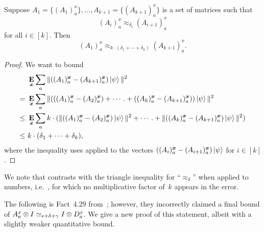 \begin{proposition}
\label{prop:triangle-inequality-for-approx_delta}
Suppose $A_1 = \{(A_1)^x_a\}, \ldots, A_{k+1} = \{(A_{k+1})^x_a\}$ is a set of matrices such that
\begin{equation*}
(A_i)^x_a \approx_{\delta_i} (A_{i+1})^x_a
\end{equation*}
for all $i \in [k]$. Then
\begin{equation*}
(A_1)^x_a \approx_{k \cdot (\delta_1 + \cdots + \delta_{k})} (A_{k+1})^x_a.
\end{equation*}
\end{proposition}
\begin{proof}
We want to bound
\begin{align*}
&~\mathop{\bf E\/}_{\boldsymbol{x}} \sum_a \Vert ((A_1)^{{\boldsymbol{x}}}_a - (A_{k+1})^{{\boldsymbol{x}}}_a) \ket{\psi}\Vert^2\\
= &~\mathop{\bf E\/}_{\boldsymbol{x}} \sum_a \Vert (((A_1)^{{\boldsymbol{x}}}_a - (A_2)^{{\boldsymbol{x}}}_a) + \cdots.+ ((A_{k})^{{\boldsymbol{x}}}_a - (A_{k+1})^{{\boldsymbol{x}}}_a))\ket{\psi}\Vert^2\\
\leq &~\mathop{\bf E\/}_{\boldsymbol{x}} \sum_a k\cdot(\Vert ((A_1)^{{\boldsymbol{x}}}_a - (A_2)^{{\boldsymbol{x}}}_a) \ket{\psi}\Vert^2 + \cdots.+ \Vert((A_k)^{{\boldsymbol{x}}}_a - (A_{k+1})^{{\boldsymbol{x}}}_a)\ket{\psi}\Vert^2)\\
\leq &~k\cdot(\delta_1 + \cdots + \delta_{k}),
\end{align*}
where the inequality uses  applied to the vectors $((A_i)^{{\boldsymbol{x}}}_a - (A_{i+1})^{{\boldsymbol{x}}}_a) \ket{\psi}$ for $i \in [k]$.
\end{proof}

We note that 
contrasts with the triangle inequality for ``$\approx_{\delta}$'' when applied to numbers,
i.e.\ ,
for which no multiplicative factor of~$k$ appears in the error.

The following is Fact~$4.29$ from~\cite{NW19};
however, they incorrectly claimed a final bound of $A^x_a \otimes I \simeq_{\epsilon +\delta + \gamma} I \otimes D^x_a$.
We give a new proof of this statement, albeit with a slightly weaker quantitative bound.

